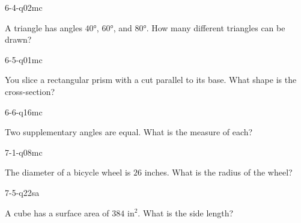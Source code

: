 \begin{practiceQuestion}{6-4-q02}{mc}
\begin{questionText}
A triangle has angles $40°$, $60°$, and $80°$. How many different triangles can be drawn?
\end{questionText}
\end{practiceQuestion}

\begin{practiceQuestion}{6-5-q01}{mc}
\begin{questionText}
You slice a rectangular prism with a cut parallel to its base. What shape is the cross-section?
\end{questionText}
\end{practiceQuestion}

\begin{practiceQuestion}{6-6-q16}{mc}
\begin{questionText}
Two supplementary angles are equal. What is the measure of each?
\end{questionText}
\end{practiceQuestion}

\begin{practiceQuestion}{7-1-q08}{mc}
\begin{questionText}
The diameter of a bicycle wheel is $26$ inches. What is the radius of the wheel?
\end{questionText}
\end{practiceQuestion}

\begin{practiceQuestion}{7-5-q22}{sa}
\begin{questionText}
A cube has a surface area of $384$ in$^2$. What is the side length?
\end{questionText}
\end{practiceQuestion}


